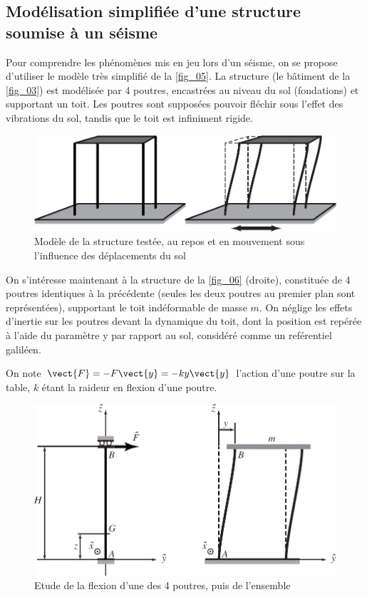 \documentclass[10pt,fleqn]{article} %
\begin{document}
\subsection{Modélisation simplifiée d’une structure soumise à un séisme}

Pour comprendre les phénomènes mis en jeu lors d’un séisme, on se propose d’utiliser le modèle très simplifié
de la \autoref{fig_05}. La structure (le bâtiment de la \autoref{fig_03}) est modélisée par 4 poutres, encastrées au niveau du sol (fondations) et supportant un toit. Les poutres sont supposées pouvoir fléchir sous l’effet des vibrations du sol, tandis que le toit est infiniment rigide.



\begin{figure}[H]
\centering
\includegraphics[width=0.7\linewidth]{fig_05}
\caption{Modèle de la structure testée, au repos et en mouvement sous l’influence des
déplacements du sol \label{fig_05}}
\end{figure}


On s’intéresse maintenant à la structure de la \autoref{fig_06} (droite), constituée de 4 poutres identiques à la
précédente (seules les deux poutres au premier plan sont représentées), supportant le toit indéformable de
masse $m$. On néglige les effets d’inertie sur les poutres devant la dynamique du toit, dont la position est repérée à l’aide du paramètre y par rapport au sol, considéré comme un reférentiel galiléen.

On note $\vect{F}=-F\vect{y} = -ky  \vect{y}$ l'action  d'une poutre sur la table, $k$ étant la raideur en flexion d'une poutre.
\begin{figure}[H]
\centering
\includegraphics[width=.7\linewidth]{fig_06}
\caption{Etude de la flexion d’une des 4 poutres, puis de l’ensemble \label{fig_06}}
\end{figure}
\end{document}

